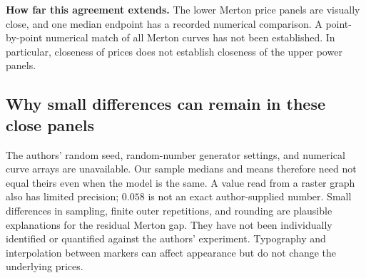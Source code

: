 \documentclass[11pt,a4paper]{article}
\begin{document}
\textbf{How far this agreement extends.} The lower Merton price panels
are visually close, and one median endpoint has a recorded numerical
comparison. A point-by-point numerical match of all Merton curves has
not been established. In particular, closeness of prices does not
establish closeness of the upper power panels.

\subsection{Why small differences can remain in these close panels}
The authors' random seed, random-number generator settings, and numerical
curve arrays are unavailable. Our sample medians and means therefore
need not equal theirs even when the model is the same. A value read
from a raster graph also has limited precision; $0.058$ is not an exact
author-supplied number. Small differences in sampling, finite outer
repetitions, and rounding are plausible explanations for the residual
Merton gap. They have not been individually identified or quantified
against the authors' experiment. Typography and interpolation between
markers can affect appearance but do not change the underlying prices.
\end{document}
